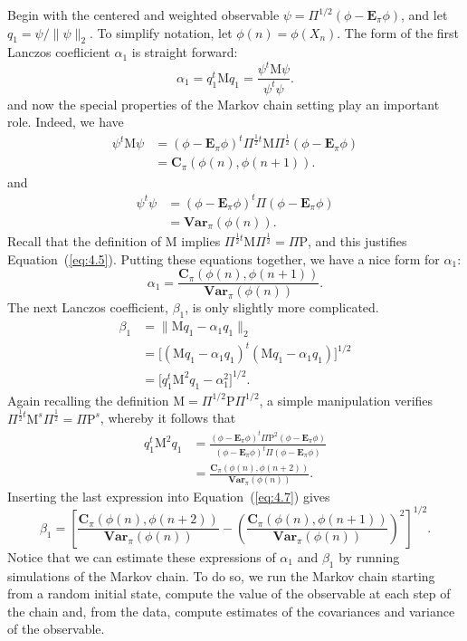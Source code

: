\documentclass[12pt,letterpaper]{report}
\theoremstyle{plain}
\theoremstyle{definition}
\theoremstyle{remark}
\numberwithin{theorem}{chapter}
\numberwithin{claim}{chapter}
\numberwithin{equation}{chapter}
\numberwithin{conjecture}{chapter}
\newcommand\bC{\ensuremath{\mathbf{C}}}
\renewcommand\P{\ensuremath{\mathrm{P}}}
\newcommand\M{\ensuremath{\mathrm{M}}}
\newcommand\bE{\ensuremath{\mathbf{E}}}
\newcommand\Var{\ensuremath{\mathbf{Var}}}
\newcommand\<{\ensuremath{\langle}}
\renewcommand\>{\ensuremath{\rangle}}
\begin{document}
Begin with the centered and weighted observable 
$\psi = \Pi^{1/2} (\phi - \bE_\pi\phi)$,
and let $q_1 = \psi/\|\psi\|_2$.
To simplify notation, let $\phi(n) = \phi(X_n)$. 
The form of the first Lanczos coeﬂicient $\alpha_1$ is straight
forward:
\[
\alpha_1 = q_1^t \M q_1  = \frac{\psi^t\M\psi}{\psi^t\psi}.
\]
and now the special properties of the Markov chain setting play an important
role. Indeed, we have
\begin{align}
\label{eq:4.5}
\psi^t\M\psi &= (\phi - \bE_\pi\phi)^t\Pi^{\frac{1}{2}t}\M\Pi^{\frac{1}{2}}(\phi- \bE_\pi \phi)\nonumber\\
&= \bC_\pi (\phi(n), \phi(n + 1)).
\end{align}
and
\begin{align}
\label{eq:4.6}
\psi^t\psi &= (\phi - \bE_\pi\phi)^t\Pi(\phi- \bE_\pi \phi)\nonumber\\
&= \Var_\pi(\phi(n)).
\end{align}
Recall that the definition of $\M$ implies 
$\Pi^{\frac{1}{2}t}\M\Pi^{\frac{1}{2}}= \Pi \P$, and this justifies 
Equation~(\ref{eq:4.5}). Putting
%
%
%
%
these equations together, we have a nice form for $\alpha_1$:
\[
\alpha_1= \frac{\bC_\pi (\phi(n), \phi(n + 1))}{\Var_\pi(\phi(n))}.
\]
The next Lanczos coefficient, $\beta_1$, is only slightly more complicated.
\begin{align}
\label{eq:4.7}
\beta_1 &= \|\M q_1 - \alpha_1 q_1\|_2 \nonumber\\
&= \bigl[(\M q_1 - \alpha_1 q_1)^t(\M q_1 - \alpha_1 q_1)\bigr]^{1/2}\nonumber\\
&= \bigl[q_1^t\M^2 q_1 - \alpha^2_1\bigr]^{1/2}.
\end{align}
Again recalling the definition $\M =\Pi^{1/2}\P\Pi^{1/2}$, a simple manipulation verifies
$\Pi^{\frac{1}{2}t}\M^s\Pi^{\frac{1}{2}} = \Pi \P^s$,
whereby it follows that
\begin{align*}
q_1^t\M^2 q_1  &= \frac{(\phi - \bE_\pi\phi)^t\Pi \P^2(\phi- \bE_\pi \phi)}
{(\phi - \bE_\pi\phi)^t\Pi (\phi- \bE_\pi \phi)} \\[8pt]
&= \frac{\bC_\pi (\phi(n), \phi(n + 2))}{\Var_\pi(\phi(n))}.
\end{align*}
Inserting the last expression into Equation~(\ref{eq:4.7}) gives
\[
\beta_1 = \left[\frac{\bC_\pi (\phi(n), \phi(n + 2))}{\Var_\pi(\phi(n))}
-\left( \frac{\bC_\pi (\phi(n), \phi(n + 1))}{\Var_\pi(\phi(n))}\right)^2
\right]^{1/2}.
\]
Notice that we can estimate these expressions of $\alpha_1$ and $\beta_1$ by
running simulations of the Markov chain. 
To do so, we run the Markov chain starting from a random initial state, compute the value of
the observable at each step of the chain and, from the data, compute estimates of the covariances
and variance of the observable.
\end{document}
